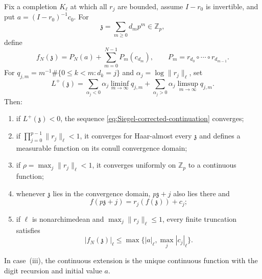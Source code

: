 \begin{theorem}
\label{thm:Siegel-numen-extension-repair}
Fix a completion $K_\ell$ at which all $r_j$ are bounded, assume
$I-r_0$ is invertible, and put $a=(I-r_0)^{-1}c_0$.  For
\[
 \mathfrak z=\sum_{m\geq0}d_m p^m\in\mathbb Z_p,
\]
define
\begin{equation}
\label{eq:Siegel-corrected-continuation}
 f_N(\mathfrak z)
 =P_N(a)+\sum_{m=0}^{N-1}P_m(c_{d_m}),
 \qquad
 P_m=r_{d_0}\circ\cdots\circ r_{d_{m-1}}.
\end{equation}
For $q_{j,m}=m^{-1}\#\{0\leq k<m:d_k=j\}$ and
$\alpha_j=\log\lVert r_j\rVert_\ell$, set
\begin{equation}
\label{eq:Siegel-upper-Lyapunov}
 L^+(\mathfrak z)=
 \sum_{\alpha_j<0}\alpha_j\liminf_{m\to\infty}q_{j,m}
 +\sum_{\alpha_j>0}\alpha_j\limsup_{m\to\infty}q_{j,m}.
\end{equation}
Then:
\begin{enumerate}[label=\textnormal{(\roman*)}]
\item if $L^+(\mathfrak z)<0$, the sequence
  \eqref{eq:Siegel-corrected-continuation} converges;
\item if $\prod_{j=0}^{p-1}\lVert r_j\rVert_\ell<1$, it converges for
  Haar-almost every $\mathfrak z$ and defines a measurable function on its
  conull convergence domain;
\item if $\rho=\max_j\lVert r_j\rVert_\ell<1$, it converges uniformly on
  $\mathbb Z_p$ to a continuous function;
\item whenever $\mathfrak z$ lies in the convergence domain,
  $p\mathfrak z+j$ also lies there and
  \[
   f(p\mathfrak z+j)=r_j(f(\mathfrak z))+c_j;
  \]
\item if $\ell$ is nonarchimedean and
  $\max_j\lVert r_j\rVert_\ell\leq1$, every finite truncation satisfies
  \[
   |f_N(\mathfrak z)|_\ell
   \leq\max\{|a|_\ell,\max_j|c_j|_\ell\}.
  \]
\end{enumerate}
In case~(iii), the continuous extension is the unique continuous function
with the digit recursion and initial value $a$.
\end{theorem}


